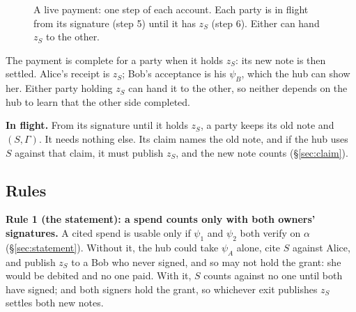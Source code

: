 \documentclass[11pt]{article}
\theoremstyle{plain}
\theoremstyle{definition}
\newcommand{\Sign}{\mathsf{Sign}}
\newcommand{\PVfy}{\mathsf{PreVerify}}
\newcommand{\Compl}{\mathsf{Complete}}
\newcommand{\Piss}{P_{\mathrm{iss}}}
\begin{document}
\begin{figure}[!tbp]
\caption{A live payment: one step of each account. Each party is in
flight from its signature (step 5) until it has $z_S$ (step 6). Either
can hand $z_S$ to the other.}
\label{fig:payment}
\end{figure}

The payment is complete for a party when it holds $z_S$: its new note
is then settled. Alice's receipt is $z_S$; Bob's acceptance is his
$\psi_B$, which the hub can show her. Either party holding $z_S$ can
hand it to the other, so neither depends on the hub to learn that the
other side completed.

\textbf{In flight.} From its signature until it holds $z_S$, a party
keeps its old note and $(S, \Gamma)$. It needs nothing else. Its claim
names the old note, and if the hub uses $S$ against that claim, it must
publish $z_S$, and the new note counts (\S\ref{sec:claim}).

\subsection{Rules}\label{sec:rules}

\textbf{Rule 1 (the statement): a spend counts only with both owners'
signatures.} A cited spend is usable only if $\psi_1$ and $\psi_2$ both
verify on $\alpha$ (\S\ref{sec:statement}). Without it, the hub could
take $\psi_A$ alone, cite $S$ against Alice, and publish $z_S$ to a Bob
who never signed, and so may not hold the grant: she would be debited
and no one paid. With it, $S$ counts against no one until both have
signed; and both signers hold the grant, so whichever exit publishes
$z_S$ settles both new notes.
\end{document}
